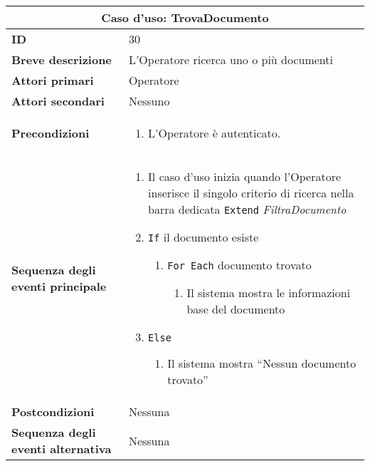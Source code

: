\documentclass[a4paper]{report}
\begin{document}
\clearpage
\begin{table}[H]
\vspace*{-0cm}
\renewcommand{\arraystretch}{1.9}
\begin{tabular}{|p{3.9cm}|p{9.9cm}|}
\hline
\multicolumn{2}{|c|}{\textbf{Caso d’uso: TrovaDocumento}} \\ \hline
	\textbf{ID} & 30 \\ \hline
	\textbf{Breve descrizione} & L’Operatore ricerca uno o più documenti \\ \hline
	\textbf{Attori primari} & Operatore \\ \hline
	\textbf{Attori secondari} & Nessuno \\ \hline
	\textbf{Precondizioni} & \begin{enumerate}[leftmargin=14pt,label=\arabic*.,labelsep=0.5em,topsep=0pt,partopsep=0pt,parsep=0pt,itemsep=0pt]
        \item L’Operatore è autenticato.
    \end{enumerate} \\ \hline
	\textbf{Sequenza degli eventi principale} & 
\begin{enumerate}[leftmargin=14pt,label=\arabic*.,labelsep=0.5em,topsep=0pt,partopsep=0pt,parsep=0pt,itemsep=0pt]
    \item Il caso d’uso inizia quando l’Operatore inserisce il singolo criterio di ricerca nella barra dedicata 
    \newline \texttt{Extend} \textit{FiltraDocumento}
    \item \texttt{If} il documento esiste
    \begin{enumerate}[label=\arabic{enumi}.\arabic*.,leftmargin=22pt,labelsep=0.5em,topsep=0pt,partopsep=0pt,parsep=0pt,itemsep=0pt]
        \item \texttt{For Each} documento trovato
        \begin{enumerate}[label=\arabic{enumi}.\arabic{enumii}.\arabic*.,leftmargin=22pt,labelsep=0.5em,topsep=0pt,partopsep=0pt,parsep=0pt,itemsep=0pt]
            \item Il sistema mostra le informazioni base del documento 
        \end{enumerate}
    \end{enumerate}
    \item \texttt{Else}
    \begin{enumerate}[label=\arabic{enumi}.\arabic*.,leftmargin=22pt,labelsep=0.5em,topsep=0pt,partopsep=0pt,parsep=0pt,itemsep=0pt]
        \item Il sistema mostra “Nessun documento trovato”
    \end{enumerate}
\end{enumerate}\\ \hline
	\textbf{Postcondizioni} & Nessuna \\ \hline
	\textbf{Sequenza degli eventi alternativa} & Nessuna \\ \hline
\end{tabular}
\end{table}
\end{document}
